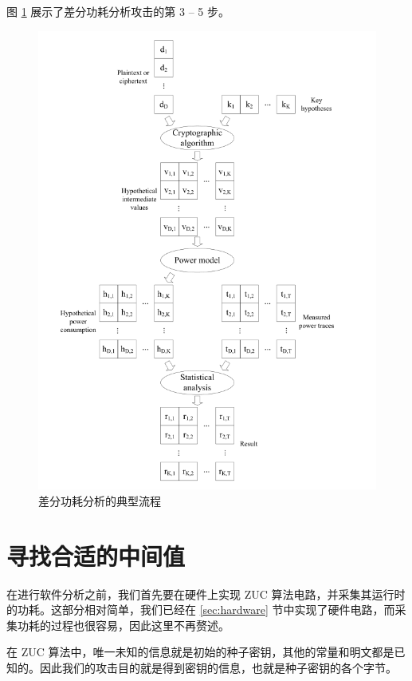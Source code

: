 图 \ref{fig:dpa} 展示了差分功耗分析攻击的第 3 -- 5 步。

\begin{figure}[htbp]

    \centering
    \includegraphics[height=.6\textheight]{../images/dpa.png}
    \caption{差分功耗分析的典型流程\cite{paa_en}}
    \label{fig:dpa}
\end{figure}

\section{寻找合适的中间值}

在进行软件分析之前，我们首先要在硬件上实现 ZUC 算法电路，并采集其运行时的功耗。这部分相对简单，我们已经在 \ref{sec:hardware} 节中实现了硬件电路，而采集功耗的过程也很容易，因此这里不再赘述。

在 ZUC 算法中，唯一未知的信息就是初始的种子密钥，其他的常量和明文都是已知的。因此我们的攻击目的就是得到密钥的信息，也就是种子密钥的各个字节。

